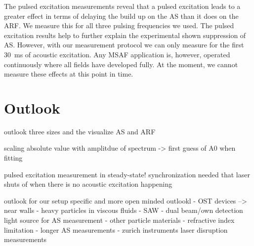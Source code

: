The pulsed excitation measurements reveal that a pulsed excitation leads to a 
greater effect in terms of delaying the build up on the AS than it does on the 
ARF. We measure this for all three pulsing frequencies we used. The pulsed 
excitation results help to further explain the experimental shown suppression 
of AS. However, with our measurement protocol we can only measure for the first 
\SI{30}{\ms} of acoustic excitation. Any MSAF application is, however, operated 
continuously where all fields have developed fully. At the moment, we cannot 
measure these effects at this point in time.


\section{Outlook}

outlook three sizes and the visualize AS and ARF

scaling absolute value with amplitdue of spectrum -> first guess of A0 when 
fitting

pulsed excitation measurement in steady-state! synchronization needed that 
laser shuts of when there is no acoustic excitation happening

outlook for our setup specific and more open minded outlookl
 - OST devices --> near walls
 - heavy particles in viscous fluids
 - SAW
 - dual beam/own detection light source for AS measurement
 - other particle materials
 - refractive index limitation
 - longer AS measurements
 - zurich instruments laser disruption measurements
